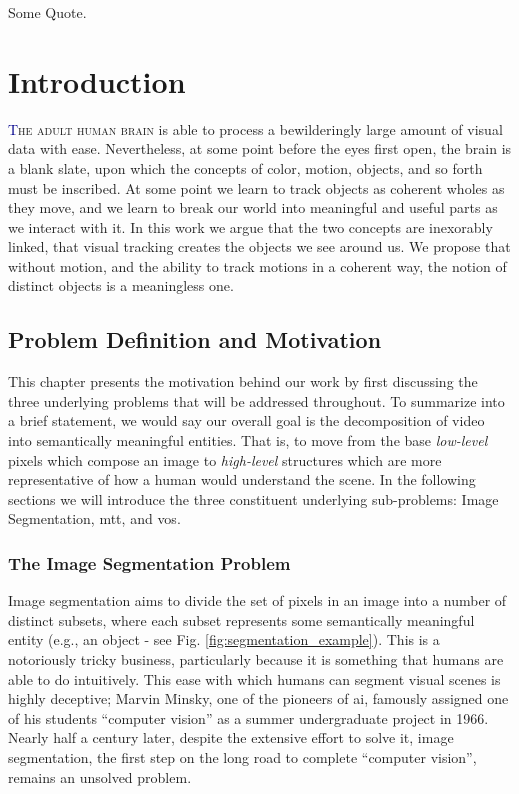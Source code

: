 \begin{savequote}[75mm]
Some Quote.
\end{savequote}


\chapter{Introduction}
\lettrine[lines=3, loversize=0.3]{\textcolor{DarkBlue}T}{he adult human brain} is able to process a bewilderingly large amount of visual data with ease. Nevertheless, at some point before the eyes first open, the brain is a blank slate, upon which the concepts of color, motion, objects, and so forth must be inscribed. At some point we learn to track objects as coherent wholes as they move, and we learn to break our world into meaningful and useful parts as we interact with it. In this work we argue that the two concepts are inexorably linked, that visual tracking creates the objects we see around us. We propose that without motion, and the ability to track motions in a coherent way, the notion of distinct objects is a meaningless one.

\section{Problem Definition and Motivation}
This chapter presents the motivation behind our work by first discussing the three underlying problems that will be addressed throughout. To summarize into a brief statement, we would say our overall goal is the decomposition of video into semantically meaningful entities. That is, to move from the base \emph{low-level} pixels which compose an image to \emph{high-level} structures which are more representative of how a human would understand the scene. In the following sections we will introduce the three constituent underlying sub-problems: Image Segmentation, \gls{mtt}, and \gls{vos}.

\subsection{The Image Segmentation Problem}
Image segmentation aims to divide the set of pixels in an image into a number of distinct subsets, where each subset represents some semantically meaningful entity (e.g., an object - see Fig. \ref{fig:segmentation_example}). This is a notoriously tricky business, particularly because it is something that humans are able to do intuitively. This ease with which humans can segment visual scenes is highly deceptive; Marvin Minsky, one of the pioneers of \gls{ai}, famously assigned one of his students ``computer vision'' as a summer undergraduate project in 1966. Nearly half a century later, despite the extensive effort to solve it, image segmentation, the first step on the long road to complete ``computer vision'', remains an unsolved problem. 

